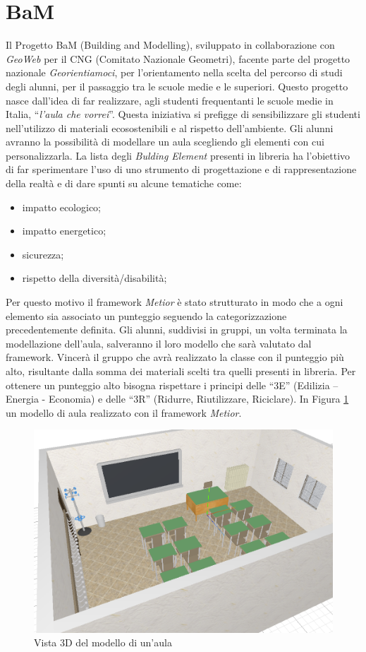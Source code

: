 \section{BaM}
\label{sec:chapter_4_section_1}
Il Progetto BaM (Building and Modelling), sviluppato in collaborazione con \emph{GeoWeb} per il CNG (Comitato Nazionale Geometri),
facente parte del progetto nazionale \emph{Georientiamoci}, per l’orientamento nella scelta
del percorso di studi degli alunni, per il passaggio tra le scuole medie e le superiori.
Questo progetto nasce dall'idea di far realizzare, agli studenti frequentanti le scuole medie in Italia,
``\emph{l'aula che vorrei}''. Questa iniziativa si prefigge di sensibilizzare gli studenti nell’utilizzo di materiali
ecosostenibili e al rispetto dell’ambiente.
Gli alunni avranno la possibilità di modellare un aula scegliendo gli elementi con cui personalizzarla.
La lista degli \emph{Bulding Element} presenti in libreria ha l’obiettivo di far sperimentare l’uso di uno strumento di progettazione
e di rappresentazione della realtà e di dare spunti su alcune tematiche come:
\begin{itemize}
\item impatto ecologico;
\item impatto energetico;
\item sicurezza;
\item rispetto della diversità/disabilità;
\end{itemize}
Per questo motivo il framework \emph{Metior} è stato strutturato in modo che a ogni elemento sia associato un punteggio seguendo
la categorizzazione precedentemente definita.
Gli alunni, suddivisi in gruppi, un volta terminata la modellazione dell'aula, salveranno il loro modello che sarà valutato
dal framework.
Vincerà il gruppo che avrà realizzato la classe con il punteggio più alto, risultante dalla somma dei materiali scelti
tra quelli presenti in libreria. Per ottenere un punteggio alto bisogna rispettare i principi delle
“3E” (Edilizia – Energia - Economia) e delle “3R” (Ridurre, Riutilizzare, Riciclare). In Figura \ref{fig:3daula}
un modello di aula realizzato con il framework \emph{Metior}.\\
\begin{figure}[htbp] %
   \centering
   \includegraphics[width=0.7\linewidth]{images/3d-school-2}
   \caption{Vista 3D del modello di un'aula}
   \label{fig:3daula}
   \end{figure}

